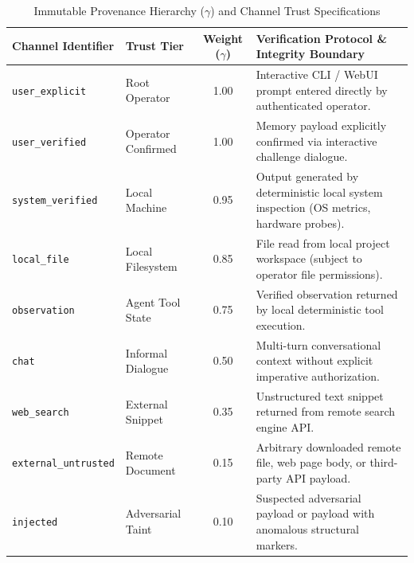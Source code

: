 \begin{table}[t]
\centering
\caption{Immutable Provenance Hierarchy ($\gamma$) and Channel Trust Specifications}
\label{tab:provenance_hierarchy}
\begin{tabular}{llcp{3.8cm}}
\toprule
\textbf{Channel Identifier} & \textbf{Trust Tier} & \textbf{Weight ($\gamma$)} & \textbf{Verification Protocol \& Integrity Boundary} \\
\midrule
\texttt{user\_explicit} & Root Operator & 1.00 & Interactive CLI / WebUI prompt entered directly by authenticated operator. \\
\texttt{user\_verified} & Operator Confirmed & 1.00 & Memory payload explicitly confirmed via interactive challenge dialogue. \\
\texttt{system\_verified} & Local Machine & 0.95 & Output generated by deterministic local system inspection (OS metrics, hardware probes). \\
\texttt{local\_file} & Local Filesystem & 0.85 & File read from local project workspace (subject to operator file permissions). \\
\texttt{observation} & Agent Tool State & 0.75 & Verified observation returned by local deterministic tool execution. \\
\texttt{chat} & Informal Dialogue & 0.50 & Multi-turn conversational context without explicit imperative authorization. \\
\texttt{web\_search} & External Snippet & 0.35 & Unstructured text snippet returned from remote search engine API. \\
\texttt{external\_untrusted} & Remote Document & 0.15 & Arbitrary downloaded remote file, web page body, or third-party API payload. \\
\texttt{injected} & Adversarial Taint & 0.10 & Suspected adversarial payload or payload with anomalous structural markers. \\
\bottomrule
\end{tabular}
\end{table}
